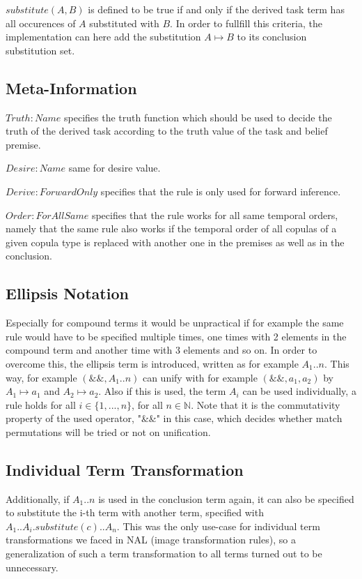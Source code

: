 \documentclass{article}
\begin{document}
$substitute(A,B)$ is defined to be true if and only if the derived task term has all occurences of $A$ substituted with $B$. In order to fullfill this criteria, the implementation can here add the substitution $A \mapsto B$ to its conclusion substitution set.

\subsection{Meta-Information}

$Truth:Name$ specifies the truth function which should be used to decide the truth of the derived task according to the truth value of the task and belief premise.

$Desire:Name$ same for desire value.

$Derive:ForwardOnly$ specifies that the rule is only used for forward inference.

$Order:ForAllSame$ specifies that the rule works for all same temporal orders,
namely that the same rule also works if the temporal order of all copulas of a given copula type is replaced with another one in the premises as well as in the conclusion.


\subsection{Ellipsis Notation}
Especially for compound terms it would be unpractical if for example the same rule would have to be specified multiple times, one times with 2 elements in the compound term and another time with 3 elements and so on. In order to overcome this, the ellipsis term is introduced, written as for example $A_1..n$. This way, for example $(\&\&,A_1..n)$ can unify with for example $(\&\&,a_1,a_2)$ by $A_1 \mapsto a_1$ and $A_2 \mapsto a_2$.
Also if this is used, the term $A_i$ can be used individually, a rule holds for all $i \in \{1,...,n\}$, for all $n \in \mathbb{N}$. Note that it is the commutativity property of the used operator, "\&\&" in this case, which decides whether match permutations will be tried or not on unification.

\subsection{Individual Term Transformation}
Additionally, if $A_1..n$ is used in the conclusion term again, it can also be specified to substitute the i-th term with another term, specified with $A_1..A_i.substitute(c)..A_n$. This was the only use-case for individual term transformations we faced in NAL (image transformation rules), so a generalization of such a term transformation to all terms turned out to be unnecessary.
\end{document}
